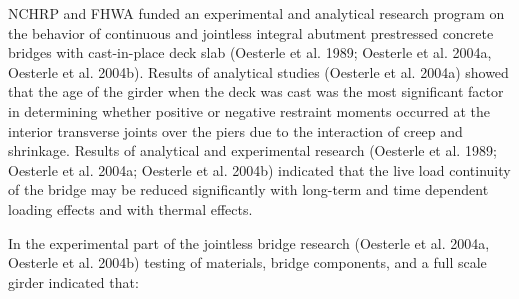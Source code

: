 NCHRP and FHWA funded an experimental and analytical research program on the behavior of continuous and jointless integral abutment prestressed concrete bridges with cast-in-place deck slab (Oesterle et al. 1989; Oesterle et al. 2004a, Oesterle et al. 2004b). Results of analytical studies (Oesterle et al. 2004a) showed that the age of the girder when the deck was cast was the most significant factor in determining whether positive or negative restraint moments occurred at the interior transverse joints over the piers due to the interaction of creep and shrinkage. Results of analytical and experimental research (Oesterle et al. 1989; Oesterle et al. 2004a; Oesterle et al. 2004b) indicated that the live load continuity of the bridge may be reduced significantly with long-term and time dependent loading effects and with thermal effects.

In the experimental part of the jointless bridge research (Oesterle et al. 2004a, Oesterle et al. 2004b) testing of materials, bridge components, and a full scale girder indicated that:

